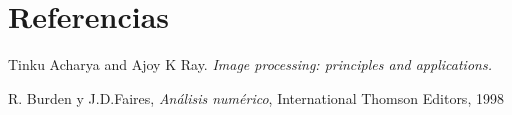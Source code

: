 \section{Referencias}

 
\begin{thebibliography}{9}

Tinku Acharya and Ajoy K Ray. \textit{Image processing: principles and applications.} 

R. Burden y J.D.Faires,  \textit{Análisis numérico}, International Thomson Editors, 1998

\end{thebibliography}
